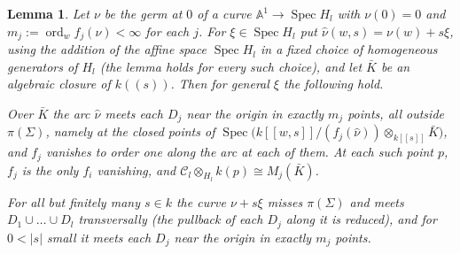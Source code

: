 \documentclass[11pt]{amsart}
\numberwithin{table}{section}
\numberwithin{figure}{section}
\numberwithin{equation}{section}
\newtheorem{lem}[thm]{Lemma}
\theoremstyle{definition}
\theoremstyle{plain}
\newcommand{\cC}{\mathcal{C}}
\newcommand{\A}{\mathbb{A}}
\DeclareMathOperator{\Spec}{Spec}
\DeclareMathOperator{\ord}{ord}
\begin{document}
\begin{lem}\label{lem:genericarc}
Let $\nu$ be the germ at $0$ of a curve $\A^1 \to \Spec H_l$ with $\nu(0) = 0$ and $m_j := \ord_w f_j(\nu) < \infty$ for each $j$. For $\xi \in \Spec H_l$ put $\hat\nu(w, s) = \nu(w) + s\xi$, using the addition of the affine space $\Spec H_l$ in a fixed choice of homogeneous generators of $H_l$ (the lemma holds for every such choice), and let $\bar K$ be an algebraic closure of $k((s))$. Then for general $\xi$ the following hold.
\begin{thmlist}
\item Over $\bar K$ the arc $\hat\nu$ meets each $D_j$ near the origin in exactly $m_j$ points, all outside $\pi(\Sigma)$, namely at the closed points of $\Spec\big(k[[w,s]]/(f_j(\hat\nu)) \otimes_{k[[s]]} \bar K\big)$, and $f_j$ vanishes to order one along the arc at each of them. At each such point $p$, $f_j$ is the only $f_i$ vanishing, and $\cC_l \otimes_{H_l} k(p) \cong M_j(\bar K)$.
\item For all but finitely many $s \in k$ the curve $\nu + s\xi$ misses $\pi(\Sigma)$ and meets $D_1 \cup \dots \cup D_l$ transversally (the pullback of each $D_j$ along it is reduced), and for $0 < |s|$ small it meets each $D_j$ near the origin in exactly $m_j$ points.
\end{thmlist}
\end{lem}
\end{document}
